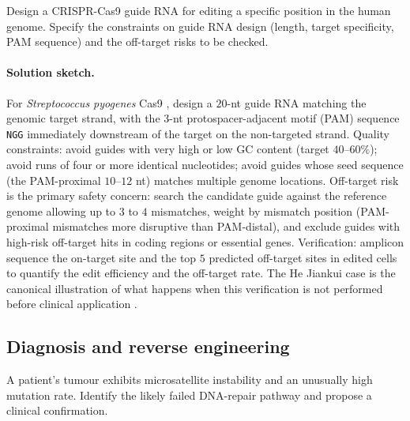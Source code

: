 \begin{exercise}
Design a CRISPR-Cas9 guide RNA for editing a specific position in the
human genome. Specify the constraints on guide RNA design (length,
target specificity, PAM sequence) and the off-target risks to be
checked.
\end{exercise}

\paragraph{Solution sketch.} For \emph{Streptococcus pyogenes} Cas9
\cite{paper:v6c03-doudna-charpentier-2014}, design a $20$-nt guide
RNA matching the genomic target strand, with the $3$-nt
protospacer-adjacent motif (PAM) sequence \texttt{NGG}
immediately downstream of the target on the non-targeted strand.
Quality constraints: avoid guides with very high or low GC content
(target $40$--$60\%$); avoid runs of four or more identical
nucleotides; avoid guides whose seed sequence (the PAM-proximal
$10$--$12$ nt) matches multiple genome locations. Off-target risk is
the primary safety concern: search the candidate guide against the
reference genome allowing up to $3$ to $4$ mismatches, weight by
mismatch position (PAM-proximal mismatches more disruptive than
PAM-distal), and exclude guides with high-risk off-target hits in
coding regions or essential genes. Verification: amplicon sequence
the on-target site and the top $5$ predicted off-target sites in
edited cells to quantify the edit efficiency and the off-target rate.
The He Jiankui case is the canonical illustration of what happens
when this verification is not performed before clinical application
\cite{acc:he-jiankui-crispr-2018}.

\subsection*{Diagnosis and reverse engineering}

\begin{exercise}
A patient's tumour exhibits microsatellite instability and an
unusually high mutation rate. Identify the likely failed DNA-repair
pathway and propose a clinical confirmation.
\end{exercise}

